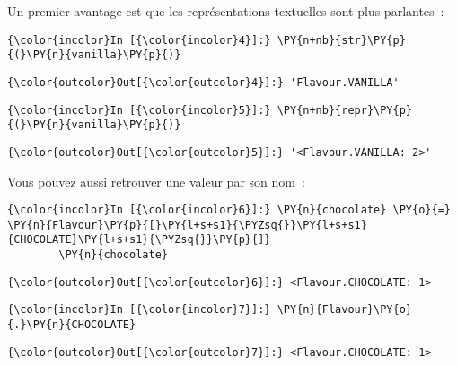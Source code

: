     Un premier avantage est que les représentations textuelles sont plus
parlantes~:

    \begin{Verbatim}[commandchars=\\\{\}]
{\color{incolor}In [{\color{incolor}4}]:} \PY{n+nb}{str}\PY{p}{(}\PY{n}{vanilla}\PY{p}{)}
\end{Verbatim}


\begin{Verbatim}[commandchars=\\\{\}]
{\color{outcolor}Out[{\color{outcolor}4}]:} 'Flavour.VANILLA'
\end{Verbatim}
            
    \begin{Verbatim}[commandchars=\\\{\}]
{\color{incolor}In [{\color{incolor}5}]:} \PY{n+nb}{repr}\PY{p}{(}\PY{n}{vanilla}\PY{p}{)}
\end{Verbatim}


\begin{Verbatim}[commandchars=\\\{\}]
{\color{outcolor}Out[{\color{outcolor}5}]:} '<Flavour.VANILLA: 2>'
\end{Verbatim}
            
    Vous pouvez aussi retrouver une valeur par son nom~:

    \begin{Verbatim}[commandchars=\\\{\}]
{\color{incolor}In [{\color{incolor}6}]:} \PY{n}{chocolate} \PY{o}{=} \PY{n}{Flavour}\PY{p}{[}\PY{l+s+s1}{\PYZsq{}}\PY{l+s+s1}{CHOCOLATE}\PY{l+s+s1}{\PYZsq{}}\PY{p}{]}
        \PY{n}{chocolate}
\end{Verbatim}


\begin{Verbatim}[commandchars=\\\{\}]
{\color{outcolor}Out[{\color{outcolor}6}]:} <Flavour.CHOCOLATE: 1>
\end{Verbatim}
            
    \begin{Verbatim}[commandchars=\\\{\}]
{\color{incolor}In [{\color{incolor}7}]:} \PY{n}{Flavour}\PY{o}{.}\PY{n}{CHOCOLATE}
\end{Verbatim}


\begin{Verbatim}[commandchars=\\\{\}]
{\color{outcolor}Out[{\color{outcolor}7}]:} <Flavour.CHOCOLATE: 1>
\end{Verbatim}
            
